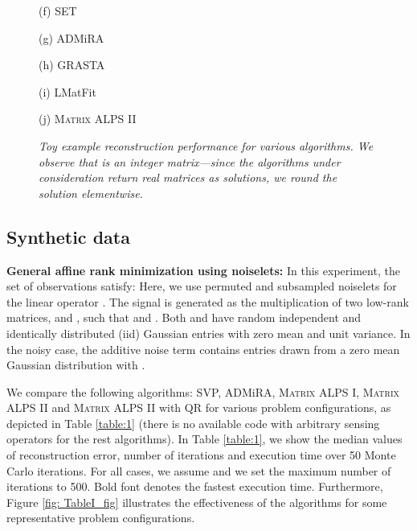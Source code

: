 \documentclass[twocolumn]{svjour3}
\begin{document}
\begin{figure*}[ht]
\hspace{1.5cm}\begin{minipage}[c]{0.15\linewidth}
\centering
 \hspace{-1.1cm} (f) SET
\end{minipage}
\hspace{0.4cm}
\begin{minipage}[c]{0.15\linewidth}
\centering
 \hspace{-1.1cm} (g) ADMiRA
\end{minipage}
\hspace{0.4cm}
\begin{minipage}[c]{0.15\linewidth}
\centering
 \hspace{-1.1cm} (h) GRASTA
\end{minipage}
\hspace{0.4cm}
\begin{minipage}[c]{0.15\linewidth}
\centering
 \hspace{-1.1cm} (i) LMatFit
\end{minipage}
\hspace{0.4cm}
\begin{minipage}[c]{0.15\linewidth}
\centering
 \hspace{-1.1cm} (j) \textsc{Matrix ALPS II}
\end{minipage}
\caption{\small\sl Toy example reconstruction performance for various algorithms. We observe that  is an integer matrix---since the algorithms under consideration return real matrices as solutions, we round the solution elementwise. } \label{fig:toy2}
\end{figure*}

\subsection{Synthetic data}

\textbf{General affine rank minimization using noiselets:} In this experiment, the set of observations  satisfy:
 Here, we use permuted and subsampled noiselets for the linear operator  \cite{sparcs}. The signal  is generated as the multiplication of two low-rank matrices,  and , such that  and . Both  and  have random independent and identically distributed (iid) Gaussian entries with zero mean and unit variance. In the noisy case, the additive noise term  contains entries drawn from a zero mean Gaussian distribution with . 

We compare the following algorithms: SVP, ADMiRA, \textsc{Matrix ALPS I}, \textsc{Matrix ALPS II} and \textsc{Matrix ALPS II} with QR for various problem configurations, as depicted in Table \ref{table:1} (there is no available code with arbitrary sensing operators for the rest algorithms). In Table \ref{table:1}, we show the median values of reconstruction error, number of iterations and execution time over 50 Monte Carlo iterations. For all cases, we assume  and we set the maximum number of iterations to 500. Bold font denotes the fastest execution time. Furthermore, Figure \ref{fig: TableI_fig} illustrates the effectiveness of the algorithms for some representative problem configurations.
\end{document}
